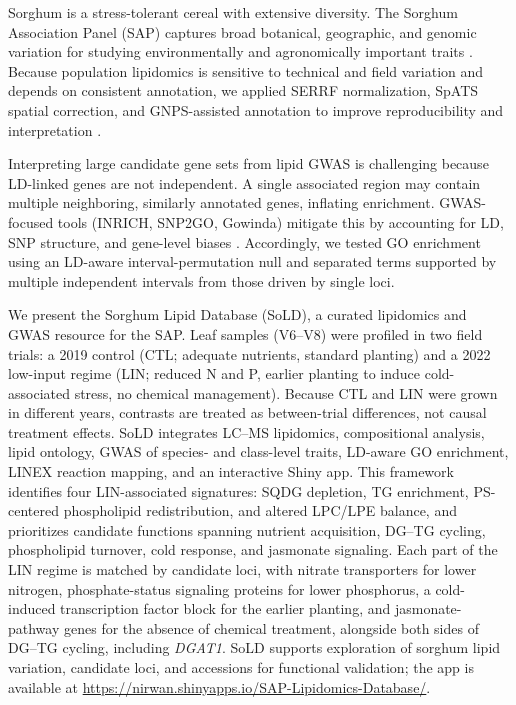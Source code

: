 \documentclass[9pt,twocolumn,twoside]{rilabRxiv}
\begin{document}
Sorghum is a stress-tolerant cereal with extensive diversity. The Sorghum Association Panel (SAP) captures broad botanical, geographic, and genomic variation for studying environmentally and agronomically important traits \citep{Casa2008CommunityResourcesSorghum, Boatwright2022}. Because population lipidomics is sensitive to technical and field variation and depends on consistent annotation, we applied SERRF normalization, SpATS spatial correction, and GNPS-assisted annotation to improve reproducibility and interpretation \citep{Fan2019, RodriguezAlvarez2018, Wang2016GNPS, Molenaar2019}.

Interpreting large candidate gene sets from lipid GWAS is challenging because LD-linked genes are not independent. A single associated region may contain multiple neighboring, similarly annotated genes, inflating enrichment. GWAS-focused tools (INRICH, SNP2GO, Gowinda) mitigate this by accounting for LD, SNP structure, and gene-level biases \citep{Lee2012INRICH,Szkiba2014SNP2GO,Kofler2012Gowinda}. Accordingly, we tested GO enrichment using an LD-aware interval-permutation null and separated terms supported by multiple independent intervals from those driven by single loci.

We present the Sorghum Lipid Database (SoLD), a curated lipidomics and GWAS resource for the SAP. Leaf samples (V6–V8) were profiled in two field trials: a 2019 control (CTL; adequate nutrients, standard planting) and a 2022 low-input regime (LIN; reduced N and P, earlier planting to induce cold-associated stress, no chemical management). Because CTL and LIN were grown in different years, contrasts are treated as between-trial differences, not causal treatment effects. SoLD integrates LC--MS lipidomics, compositional analysis, lipid ontology, GWAS of species- and class-level traits, LD-aware GO enrichment, LINEX reaction mapping, and an interactive Shiny app. This framework identifies four LIN-associated signatures: SQDG depletion, TG enrichment, PS-centered phospholipid redistribution, and altered LPC/LPE balance, and prioritizes candidate functions spanning nutrient acquisition, DG–TG cycling, phospholipid turnover, cold response, and jasmonate signaling. Each part of the LIN regime is matched by candidate loci, with nitrate transporters for lower nitrogen, phosphate-status signaling proteins for lower phosphorus, a cold-induced transcription factor block for the earlier planting, and jasmonate-pathway genes for the absence of chemical treatment, alongside both sides of DG--TG cycling, including \textit{DGAT1}. SoLD supports exploration of sorghum lipid variation, candidate loci, and accessions for functional validation; the app is available at \url{https://nirwan.shinyapps.io/SAP-Lipidomics-Database/}.
\end{document}
